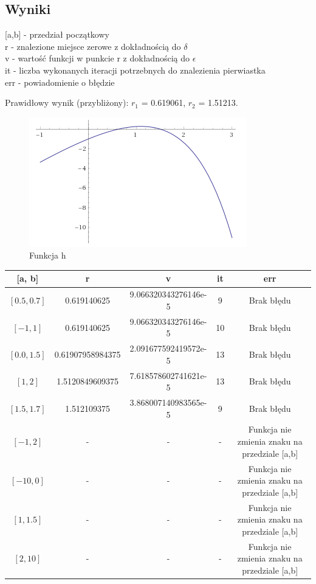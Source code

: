 \documentclass[11pt, a4paper]{article}
\begin{document}
    \subsection{Wyniki}
    [a,b] - przedział początkowy \\
    r - znalezione miejsce zerowe z dokładnością do $\delta$ \\
    v - wartość funkcji w punkcie r z dokładnością do $\epsilon$ \\
    it - liczba wykonanych iteracji potrzebnych do znalezienia pierwiastka \\
    err - powiadomienie o błędzie

    Prawidłowy wynik (przybliżony): $r_{1}$ = 0.619061, $r_{2}$ = 1.51213.
    \begin{figure}[H]
        \caption{Funkcja h}
        \centering
        \begin{minipage}{0.4\textwidth}
            \includegraphics[width=\linewidth]{zad5}
        \end{minipage}
    \end{figure}
    \begin{center}
        \begin{tabular}{c|c|c|c|c}
            [a, b] & r & v & it & err\\
            \hline
            $[0.5, 0.7]$ & 0.619140625 & 9.066320343276146e-5 & 9 & Brak błędu\\
            $[-1, 1]$ & 0.619140625 & 9.066320343276146e-5 & 10 & Brak błędu\\
            $[0.0, 1.5]$ & 0.61907958984375 & 2.091677592419572e-5 & 13 & Brak błędu\\
            $[1, 2]$ & 1.5120849609375 & 7.618578602741621e-5 & 13 & Brak błędu\\
            $[1.5, 1.7]$ & 1.512109375 & 3.868007140983565e-5 & 9 & Brak błędu\\
            $[-1, 2]$ & - & - & - & Funkcja nie zmienia znaku na przedziale [a,b]\\
            $[-10, 0]$ & - & - & - & Funkcja nie zmienia znaku na przedziale [a,b]\\
            $[1, 1.5]$ & - & - & - & Funkcja nie zmienia znaku na przedziale [a,b]\\
            $[2, 10]$ & - & - & - & Funkcja nie zmienia znaku na przedziale [a,b]
        \end{tabular}
    \end{center}
\end{document}
